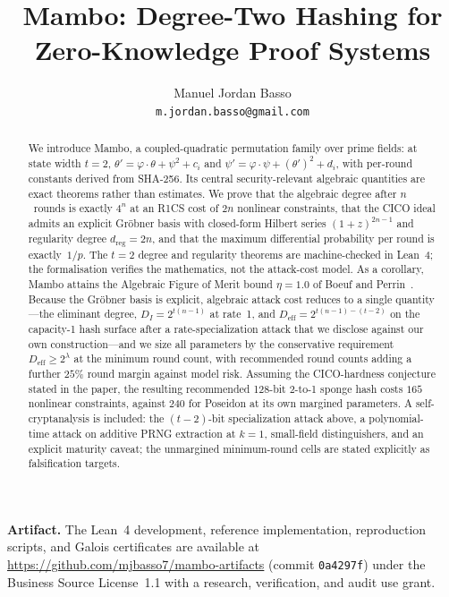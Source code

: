 \documentclass[11pt,a4paper]{article}
\title{Mambo: Degree-Two Hashing for Zero-Knowledge Proof Systems}
\author{%
  Manuel Jordan Basso\\
  \texttt{m.jordan.basso@gmail.com}%
}
\date{}
\theoremstyle{definition}
\begin{document}
\maketitle

\begin{abstract}
We introduce Mambo, a coupled-quadratic permutation family over prime
fields: at state width $t=2$, $\theta' = \varphi\cdot\theta + \psi^2 +
c_i$ and $\psi' = \varphi\cdot\psi + (\theta')^2 + d_i$, with per-round
constants derived from SHA-256. Its central security-relevant algebraic
quantities are exact theorems rather than estimates. We prove that the
algebraic degree after $n$~rounds is exactly $4^n$ at an R1CS cost of
$2n$ nonlinear constraints, that the CICO ideal admits an explicit
Gr\"obner basis with closed-form Hilbert series $(1+z)^{2n-1}$ and
regularity degree $d_{\mathrm{reg}} = 2n$, and that the maximum
differential probability per round is exactly~$1/p$. The $t=2$ degree
and regularity theorems are machine-checked in Lean~4; the
formalisation verifies the mathematics, not the attack-cost model. As
a corollary, Mambo attains the Algebraic Figure of Merit bound
$\eta = 1.0$ of Boeuf and Perrin~\cite{ALFOMs}. Because the Gr\"obner
basis is explicit, algebraic attack cost reduces to a single
quantity---the eliminant degree, $D_I = 2^{t(n-1)}$ at rate~1, and
$D_{\mathrm{eff}} = 2^{t(n-1)-(t-2)}$ on the capacity-1 hash surface
after a rate-specialization attack that we disclose against our own
construction---and we size all parameters by the conservative
requirement $D_{\mathrm{eff}} \ge 2^{\lambda}$ at the minimum round
count, with recommended round counts adding a further $25\%$ round
margin against model risk. Assuming the CICO-hardness conjecture
stated in the paper, the resulting recommended 128-bit 2-to-1 sponge
hash costs $165$ nonlinear constraints, against $240$ for Poseidon at
its own margined parameters. A self-cryptanalysis is included: the
$(t-2)$-bit specialization attack above, a polynomial-time attack on
additive PRNG extraction at $k=1$, small-field distinguishers, and an
explicit maturity caveat; the unmargined minimum-round cells are
stated explicitly as falsification targets.
\end{abstract}

\medskip
\noindent\textbf{Artifact.} The Lean~4 development, reference
implementation, reproduction scripts, and Galois certificates are
available at \url{https://github.com/mjbasso7/mambo-artifacts}
(commit \texttt{0a4297f}) under the Business Source License~1.1 with a
research, verification, and audit use grant.
\end{document}
